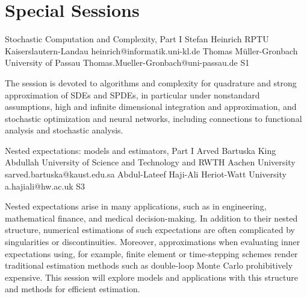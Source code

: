 \chapter{Special Sessions}

\begin{session}
 {Stochastic Computation and Complexity, Part I}%
 {Stefan Heinrich}%
 {RPTU Kaiserslautern-Landau}%
 {heinrich@informatik.uni-kl.de}%
 {Thomas M\"uller-Gronbach}%
 {University of Passau}%
 {Thomas.Mueller-Gronbach@uni-passau.de}%
 {S1}%
 {}%

 The session is devoted to algorithms and complexity for
 quadrature and strong approximation of SDEs and SPDEs, in particular under nonstandard assumptions,
 high and infinite dimensional integration and approximation, and
 stochastic optimization and neural networks,
 including connections to functional analysis and stochastic analysis.
 \medskip
\end{session}



\clearpage

\begin{session}
 {Nested expectations: models and estimators, Part I}%
 {Arved Bartuska}%
 {King Abdullah University of Science and Technology and RWTH Aachen University}%
 {sarved.bartuska@kaust.edu.sa}%
 {Abdul-Lateef Haji-Ali}%
 {Heriot-Watt University}%
 {a.hajiali@hw.ac.uk}%
 {S3}%
{}

 Nested expectations
 arise in many applications, such as in engineering, mathematical finance, and medical decision-making. In addition to their nested structure, numerical estimations of such expectations are often complicated by singularities or discontinuities. Moreover, approximations when evaluating inner expectations using, for example, finite element or time-stepping schemes render traditional estimation methods such as double-loop Monte Carlo prohibitively expensive. This session will explore models and applications with this structure and methods for efficient estimation.
\end{session}


